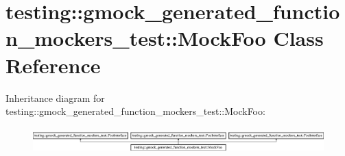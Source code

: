 \hypertarget{classtesting_1_1gmock__generated__function__mockers__test_1_1_mock_foo}{}\section{testing\+::gmock\+\_\+generated\+\_\+function\+\_\+mockers\+\_\+test\+::Mock\+Foo Class Reference}
\label{classtesting_1_1gmock__generated__function__mockers__test_1_1_mock_foo}
Inheritance diagram for testing\+::gmock\+\_\+generated\+\_\+function\+\_\+mockers\+\_\+test\+::Mock\+Foo\+:\begin{figure}[H]
\begin{center}
\leavevmode
\includegraphics[height=1.003584cm]{dc/d07/classtesting_1_1gmock__generated__function__mockers__test_1_1_mock_foo}
\end{center}
\end{figure}
